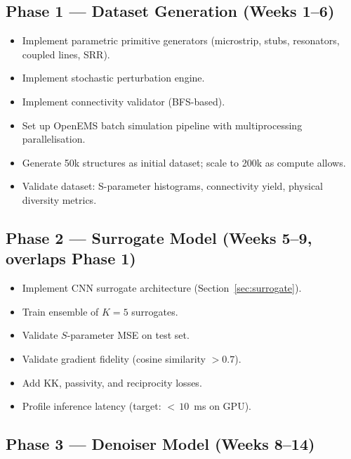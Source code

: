 \documentclass[12pt,a4paper]{article}
\theoremstyle{definition}
\theoremstyle{plain}
\theoremstyle{remark}
\begin{document}
\subsection{Phase 1 — Dataset Generation (Weeks 1--6)}

\begin{itemize}
  \item[$\square$] Implement parametric primitive generators
        (microstrip, stubs, resonators, coupled lines, SRR).
  \item[$\square$] Implement stochastic perturbation engine.
  \item[$\square$] Implement connectivity validator (BFS-based).
  \item[$\square$] Set up OpenEMS batch simulation pipeline
        with multiprocessing parallelisation.
  \item[$\square$] Generate 50k structures as initial dataset; scale to 200k as
        compute allows.
  \item[$\square$] Validate dataset: S-parameter histograms, connectivity yield,
        physical diversity metrics.
\end{itemize}

\subsection{Phase 2 — Surrogate Model (Weeks 5--9, overlaps Phase 1)}

\begin{itemize}
  \item[$\square$] Implement CNN surrogate architecture (Section~\ref{sec:surrogate}).
  \item[$\square$] Train ensemble of $K=5$ surrogates.
  \item[$\square$] Validate $S$-parameter MSE on test set.
  \item[$\square$] Validate gradient fidelity (cosine similarity $> 0.7$).
  \item[$\square$] Add KK, passivity, and reciprocity losses.
  \item[$\square$] Profile inference latency (target: ${<}\,10$~ms on GPU).
\end{itemize}

\subsection{Phase 3 — Denoiser Model (Weeks 8--14)}
\end{document}
